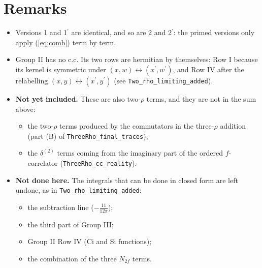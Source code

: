 \documentclass[10pt]{article}
\numberwithin{equation}{section}
\begin{document}
\section{Remarks}
\begin{itemize}
\item Versions 1 and 1$^{\prime}$ are identical, and so are 2 and 2$^{\prime}$: the primed versions only apply (\ref{eq:comb}) term by term.
\item Group II has no c.c. Its two rows are hermitian by themselves: Row I because its kernel is symmetric under $(x,w)\leftrightarrow(x^{\prime},w^{\prime})$, and Row IV after the relabelling $(x,y)\leftrightarrow(x^{\prime},y^{\prime})$ (see \texttt{Two\_rho\_limiting\_added}).
\item \textbf{Not yet included.} These are also two-$\rho$ terms, and they are not in the sum above:
\begin{itemize}
\item the two-$\rho$ terms produced by the commutators in the three-$\rho$ addition (part (B) of \texttt{ThreeRho\_final\_traces});
\item the $\delta^{(2)}$ terms coming from the imaginary part of the ordered $f$-correlator (\texttt{ThreeRho\_cc\_reality}).
\end{itemize}
\item \textbf{Not done here.} The integrals that can be done in closed form are left undone, as in \texttt{Two\_rho\_limiting\_added}:
\begin{itemize}
\item the subtraction line ($-\frac{11}{12\pi}$);
\item the third part of Group III;
\item Group II Row IV (Ci and Si functions);
\item the combination of the three $N_{2f}$ terms.
\end{itemize}
\end{itemize}
\end{document}
